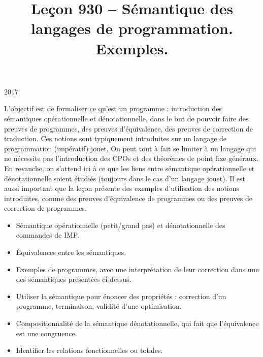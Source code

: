 \documentclass{agregfiche}
\title{Leçon 930 -- Sémantique des langages de programmation. Exemples.}
\begin{document}
\maketitle

\secrapports

\begin{rapport}{2017}

    L’objectif est de formaliser ce qu’est un programme : introduction des
    sémantiques opérationnelle et dénotationnelle, dans le but de pouvoir faire
    des preuves de programmes, des preuves d’équivalence, des preuves de
    correction de traduction. Ces notions sont typiquement introduites sur un
    langage de programmation (impératif) jouet. On peut tout à fait se limiter à
    un langage qui ne nécessite pas l’introduction des CPOs et des théorèmes de
    point fixe généraux. En revanche, on s’attend ici à ce que les liens entre
    sémantique opérationnelle et dénotationnelle soient étudiés (toujours dans le
    cas d’un langage jouet). Il est aussi important que la leçon présente des
    exemples d’utilisation des notions introduites, comme des preuves
    d’équivalence de programmes ou des preuves de correction de programmes.

\end{rapport}

\secindispensables

\begin{itemize}
    \item Sémantique opérationnelle (petit/grand pas) et dénotationnelle des commandes de IMP.
    \item Équivalences entre les 
        sémantiques.
     \item Exemples de programmes, avec une interprétation de leur 
     correction dans une des sémantiques présentées ci-dessus.
\end{itemize}

\secasavoir

\begin{itemize}
	\item Utiliser la sémantique pour énoncer des propriétés : correction d'un
	programme, terminaison, validité d'une optimisation.
    \item Compositionnalité de la sémantique dénotationnelle, qui fait que l'équivalence est une congruence.
    \item Identifier les relations fonctionnelles ou totales.
\end{itemize}

\secidees
\end{document}
